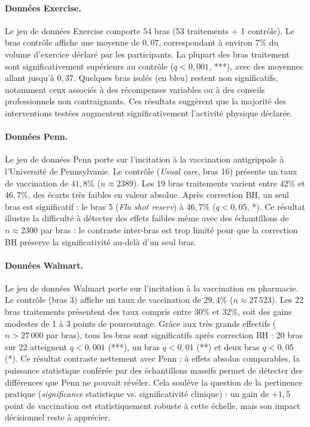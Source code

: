 \documentclass[10.5pt,a4paper]{article}
\begin{document}
\paragraph{Données Exercise.}



Le jeu de données Exercise comporte 54 bras (53 traitements + 1 contrôle). Le bras contrôle affiche une moyenne de $0{,}07$, correspondant à environ 7\% du volume d'exercice déclaré par les participants. La plupart des bras traitement sont significativement supérieurs au contrôle ($q < 0{,}001$, ***), avec des moyennes allant jusqu'à $0{,}37$. Quelques bras isolés (en bleu) restent non significatifs, notamment ceux associés à des récompenses variables ou à des conseils professionnels non contraignants. Ces résultats suggèrent que la majorité des interventions testées augmentent significativement l'activité physique déclarée.

\paragraph{Données Penn.}



Le jeu de données Penn porte sur l'incitation à la vaccination antigrippale à l'Université de Pennsylvanie. Le contrôle (\textit{Usual care}, bras 16) présente un taux de vaccination de $41{,}8\%$ ($n \approx 2389$). Les 19 bras traitements varient entre $42\%$ et $46{,}7\%$, des écarts très faibles en valeur absolue. Après correction BH, un seul bras est significatif : le bras 5 (\textit{Flu shot reserv}) à $46{,}7\%$ ($q < 0{,}05$, *). Ce résultat illustre la difficulté à détecter des effets faibles même avec des échantillons de $n \approx 2300$ par bras : le contraste inter-bras est trop limité pour que la correction BH préserve la significativité au-delà d'un seul bras.

\paragraph{Données Walmart.}


Le jeu de données Walmart porte sur l'incitation à la vaccination en pharmacie. Le contrôle (bras 3) affiche un taux de vaccination de $29{,}4\%$ ($n \approx 27\,523$). Les 22 bras traitements présentent des taux compris entre $30\%$ et $32\%$, soit des gains modestes de 1 à 3 points de pourcentage. Grâce aux très grands effectifs ($n > 27\,000$ par bras), tous les bras sont significatifs après correction BH : 20 bras sur 22 atteignent $q < 0{,}001$ (***), un bras $q < 0{,}01$ (**) et deux bras $q < 0{,}05$ (*). Ce résultat contraste nettement avec Penn : à effets absolus comparables, la puissance statistique conférée par des échantillons massifs permet de détecter des différences que Penn ne pouvait révéler. Cela soulève la question de la pertinence pratique (\textit{significance} statistique vs. significativité clinique) : un gain de $+1{,}5$ point de vaccination est statistiquement robuste à cette échelle, mais son impact décisionnel reste à apprécier.
\end{document}
